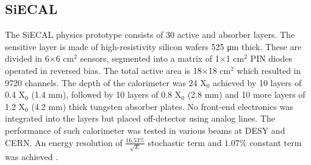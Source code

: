\subsection{SiECAL}

The SiECAL physics prototype consists of 30 active and absorber layers. The sensitive layer is made of high-resistivity silicon wafers 525 \si{\micro\meter} thick. These are divided in 6$\times$6 cm$^2$ sensors, segmented into a matrix of 1$\times$1 cm$^2$ PIN diodes operated in reversed bias. The total active area is 18$\times$18 cm$^2$ which resulted in 9720 channels. The depth of the calorimeter was 24 X$_0$ achieved by 10 layers of 0.4 X$_0$ (1.4 mm), followed by 10 layers of 0.8 X$_0$ (2.8 mm) and 10 more layers of 1.2 X$_0$ (4.2 mm) thick tungsten absorber plates. No front-end electronics was integrated into the layers but placed off-detector using analog lines. The performance of such calorimeter was tested in various beams at DESY and CERN. An energy resolution of $\frac{16.53\%}{\sqrt{E}}$ stochastic term and $1.07\%$ constant term was achieved \cite{ADLOFF2009372}.

